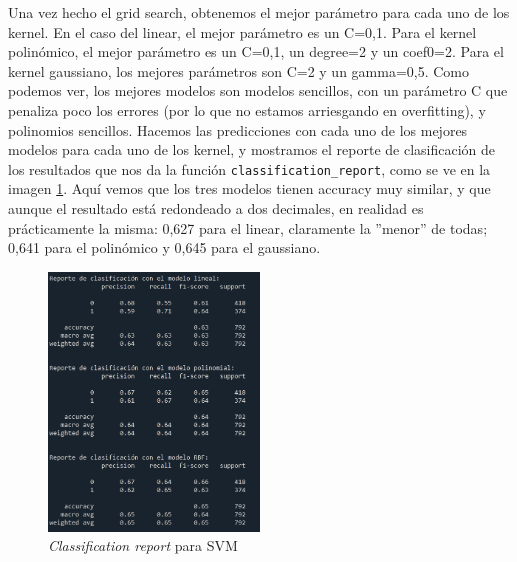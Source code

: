 \documentclass[a4paper,onecolumn]{extarticle}
\begin{document}
\begin{sloppypar}
Una vez hecho el grid search, obtenemos el mejor parámetro para cada uno de los kernel. En el caso del linear, el mejor parámetro es un C=0,1. Para el kernel 
polinómico, el mejor parámetro es un C=0,1, un degree=2 y un coef0=2. Para el kernel gaussiano, los mejores parámetros son C=2 y un gamma=0,5. Como podemos ver,
los mejores modelos son modelos sencillos, con un parámetro C que penaliza poco los errores (por lo que no estamos arriesgando en overfitting), y polinomios 
sencillos. Hacemos las predicciones con cada uno de los mejores modelos para cada uno de los kernel, y mostramos el reporte de clasificación de los resultados 
que nos da la función \texttt{classification\_report}, como se ve en la imagen \ref{fig:reportKernels}. Aquí vemos que los tres modelos tienen accuracy muy
similar, y que aunque el resultado está redondeado a dos decimales, en realidad es prácticamente la misma: 0,627 para el linear, claramente la ''menor'' de todas;
0,641 para el polinómico y 0,645 para el gaussiano.
\begin{figure}[h]
    \centering
    \includegraphics[width=0.5\textwidth]{imgs/reportKernels.png}
    \caption{\textit{Classification report} para SVM} \label{fig:reportKernels}
\end{figure}


\end{sloppypar}
\end{document}
